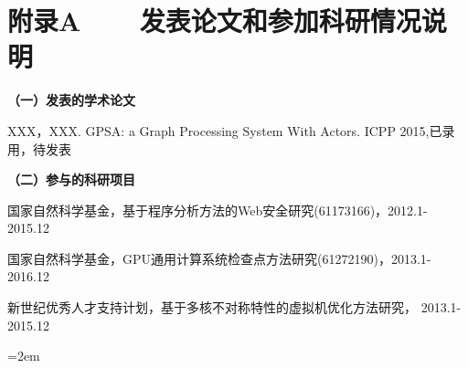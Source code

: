 
\chapter*{附录A~~~~发表论文和参加科研情况说明}
\setlength{\parindent}{0em}
\textbf{（一）发表的学术论文}
\begin{publist}
	\item XXX，XXX. GPSA: a Graph Processing System With Actors. ICPP 2015,已录用，待发表
\end{publist}

\vspace*{1em}

\textbf{（二）参与的科研项目}
\begin{publist}
\item 国家自然科学基金，基于程序分析方法的Web安全研究(61173166)，2012.1-2015.12

\item 国家自然科学基金，GPU通用计算系统检查点方法研究(61272190)，2013.1-2016.12

\item 新世纪优秀人才支持计划，基于多核不对称特性的虚拟机优化方法研究， 2013.1-2015.12
\end{publist}
\vfill
{}\hangindent=2em\noindent

\setlength{\parindent}{2em}
